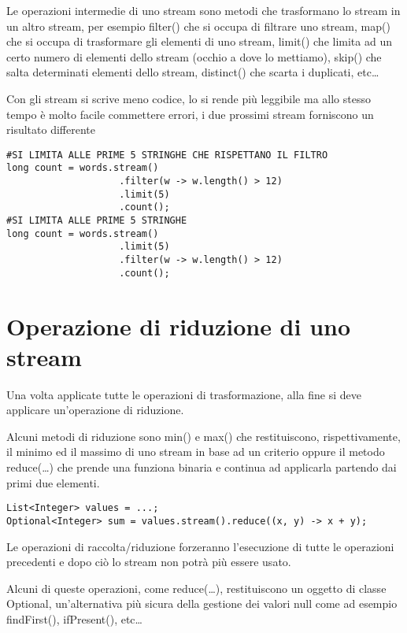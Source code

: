 Le operazioni intermedie di uno stream sono metodi che trasformano lo stream in un altro stream, per esempio filter() che si occupa di filtrare uno stream, map()
che si occupa di trasformare gli elementi di uno stream, limit() che limita ad un certo numero di elementi dello stream (occhio a dove lo mettiamo), skip() che salta 
determinati elementi dello stream, distinct() che scarta i duplicati, etc\dots
\smallskip

Con gli stream si scrive meno codice, lo si rende più leggibile ma allo stesso tempo è molto facile commettere errori, i due prossimi stream forniscono un risultato 
differente

\begin{lstlisting}
#SI LIMITA ALLE PRIME 5 STRINGHE CHE RISPETTANO IL FILTRO
long count = words.stream()
                    .filter(w -> w.length() > 12)
                    .limit(5)
                    .count();
#SI LIMITA ALLE PRIME 5 STRINGHE                    
long count = words.stream()
                    .limit(5)
                    .filter(w -> w.length() > 12)
                    .count();
\end{lstlisting}

\section{Operazione di riduzione di uno stream}

Una volta applicate tutte le operazioni di trasformazione, alla fine si deve applicare un’operazione di riduzione.

Alcuni metodi di riduzione sono min() e max() che restituiscono, rispettivamente, il minimo ed il massimo di uno stream in base ad un criterio oppure il metodo 
reduce(\dots) che prende una funziona binaria e continua ad applicarla partendo dai primi due elementi.
\begin{lstlisting}
List<Integer> values = ...;
Optional<Integer> sum = values.stream().reduce((x, y) -> x + y);
\end{lstlisting}

Le operazioni di raccolta/riduzione forzeranno l’esecuzione di tutte le operazioni precedenti e dopo ciò lo stream non potrà più essere usato.

Alcuni di queste operazioni, come reduce(\dots), restituiscono un oggetto di classe Optional, un’alternativa più sicura della gestione dei valori null come ad esempio 
findFirst(), ifPresent(), etc\dots



